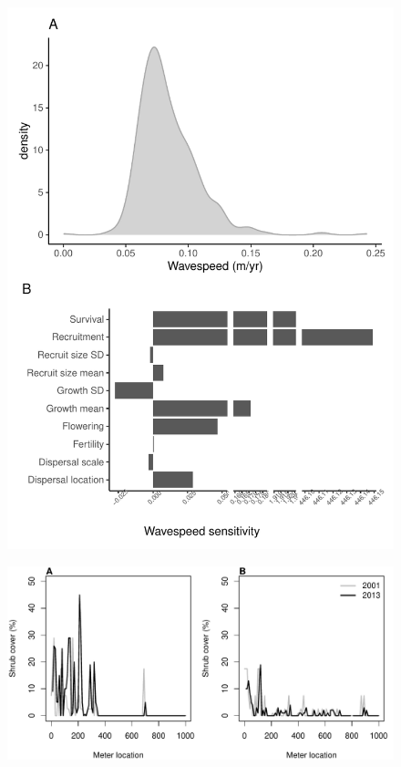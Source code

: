 \documentclass[11pt]{article}\usepackage[]{graphicx}\usepackage[]{color}
\begin{document}
\newpage
\begin{figure}[H]
  \begin{center}
    \includegraphics[width=\linewidth]{Figures/wavespeed_sens}
  \caption{}
  \label{fig:wavespeed}
  \end{center}
\end{figure}

\newpage
\begin{figure}[H]
  \begin{center}
    \includegraphics[width=\linewidth]{Figures/resurveys}
  \caption{}
  \label{fig:resurvey}
  \end{center}
\end{figure}
\end{document}
